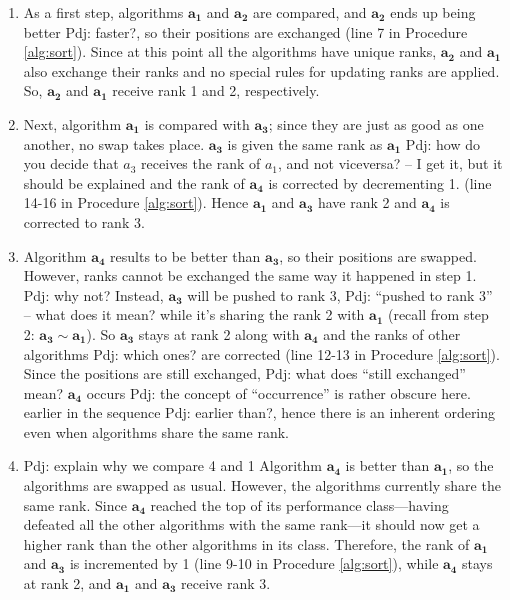\documentclass[conference]{IEEEtran}
\newcommand{\p}[1]{{\color{blue} Pdj: #1}}
\begin{document}
\begin{enumerate}
	\item 
          As a first step, algorithms $\mathbf{a_1}$ and $\mathbf{a_2}$ are compared, and 
          $\mathbf{a_2}$ ends up being better \p{faster?}, so their positions are exchanged (line 7 in
          Procedure \ref{alg:sort}). Since at this point all the algorithms have unique ranks, $\mathbf{a_2}$ and
          $\mathbf{a_1}$ also exchange their ranks and no special rules for updating ranks are applied.
          So, $\mathbf{a_2}$ and $\mathbf{a_1}$ receive rank 1 and 2, respectively.
	
	\item Next, algorithm $\mathbf{a_1}$ is compared with $\mathbf{a_3}$;
          since they are just as good as one another, 
          no swap takes place.
          $\mathbf{a_3}$ is given the same rank as $\mathbf{a_1}$ \p{how do you decide that $a_3$ receives the rank of
            $a_1$, and not viceversa? -- I get it, but it should be explained}
            and the rank of $\mathbf{a_4}$ is corrected by
         decrementing 1. (line 14-16 in Procedure \ref{alg:sort}). Hence $\mathbf{a_1}$ and $\mathbf{a_3}$ have rank 2 and $\mathbf{a_4}$ is corrected to rank 3.
	
	\item Algorithm $\mathbf{a_4}$ results to be better than $\mathbf{a_3}$, so their positions are
          swapped. However, ranks cannot be exchanged the same way it happened in step 1.
          \p{why not?}
          Instead, $\mathbf{a_3}$ will be pushed to rank 3, \p{``pushed to rank 3'' -- what does it mean?} while it's
          sharing the rank 2 with $\mathbf{a_1}$ (recall from step 2: $\mathbf{a_3} \sim \mathbf{a_1}$). So
          $\mathbf{a_3}$ stays at rank 2 along with $\mathbf{a_4}$ and the ranks of other algorithms \p{which ones?} are
          corrected (line 12-13 in Procedure \ref{alg:sort}). Since the positions are still exchanged, \p{what does
            ``still exchanged'' mean?} $\mathbf{a_4}$ occurs \p{the concept of ``occurrence'' is rather obscure
            here.} earlier in the sequence \p{earlier than?}, hence there is an inherent ordering even when algorithms share the same rank. 
		
	\item
          \p{explain why we compare 4 and 1}
          Algorithm $\mathbf{a_4}$ is better than $\mathbf{a_1}$, so the algorithms are swapped as usual. However, the
          algorithms currently share the same rank. Since $\mathbf{a_4}$ reached the top of its performance
          class---having defeated all the other algorithms with the same rank---it should now get a higher rank than the
          other algorithms in its class. Therefore, the rank of $\mathbf{a_1}$ and $\mathbf{a_3}$ is incremented by 1
          (line 9-10 in Procedure \ref{alg:sort}), while $\mathbf{a_4}$ stays at rank 2, and $\mathbf{a_1}$ and $\mathbf{a_3}$ receive rank 3.
	

\end{enumerate}
\end{document}
